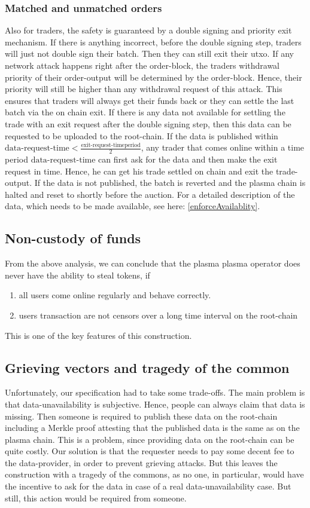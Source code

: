 \documentclass[11pt,parskip=full]{scrartcl}%
\begin{document}
\subsubsection{Matched and unmatched orders}
Also for traders, the safety is guaranteed by a  double signing and priority exit mechanism. 
If there is anything incorrect, before the double signing step, traders will just not double sign their batch. 
Then they can still exit their utxo.
If any network attack happens right after the order-block, the traders withdrawal priority of their order-output will be determined by the order-block.
Hence, their priority will still be higher than any withdrawal request of this attack.
This ensures that traders will always get their funds back or they can settle the last batch via the on chain exit. 
If there is any data not available for settling the trade with an exit request after the double signing step, then this data can be requested to be uploaded to the root-chain. 
If the data is published within $\text{data-request-time}< \frac{\text{exit-request-timeperiod}}{2}$, any trader that comes online within a time period  $\text{data-request-time}$ can first ask for the data and then make the exit request in time. Hence, he can get his trade settled on chain and exit the trade-output.
If the data is not published, the batch is reverted and the plasma chain is halted and reset to shortly before the auction. 
For a detailed description of the data, which needs to be made available, see here: \ref{enforceAvailablity}. 


\subsection{Non-custody of funds}
From the above analysis, we can conclude that the plasma plasma operator does never have the ability to steal tokens, if
\begin{enumerate}
\item all users come online regularly and behave correctly. 
\item users transaction are not censors over a long time interval on the root-chain
\end{enumerate}
This is one of the key features of this construction. 

\subsection{Grieving vectors and tragedy of the common}
Unfortunately, our specification had to take some trade-offs. 
The main problem is that data-unavailability is subjective. 
Hence, people can always claim that data is missing. 
Then someone is required to publish these data on the root-chain including a Merkle proof attesting that the published data is the same as on the plasma chain. 
This is a problem, since providing data on the root-chain can be quite costly. 
Our solution is that the requester needs to pay some decent fee to the data-provider, in order to prevent grieving attacks. 
But this leaves the construction with a tragedy of the commons, as no one, in particular, would have the incentive to ask for the data in case of a real data-unavailability case. 
But still, this action would be required from someone. 
\end{document}
